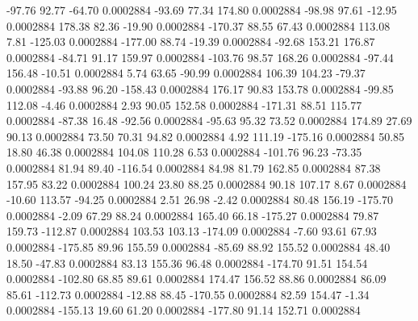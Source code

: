       -97.76       92.77      -64.70     0.0002884
      -93.69       77.34      174.80     0.0002884
      -98.98       97.61      -12.95     0.0002884
      178.38       82.36      -19.90     0.0002884
     -170.37       88.55       67.43     0.0002884
      113.08        7.81     -125.03     0.0002884
     -177.00       88.74      -19.39     0.0002884
      -92.68      153.21      176.87     0.0002884
      -84.71       91.17      159.97     0.0002884
     -103.76       98.57      168.26     0.0002884
      -97.44      156.48      -10.51     0.0002884
        5.74       63.65      -90.99     0.0002884
      106.39      104.23      -79.37     0.0002884
      -93.88       96.20     -158.43     0.0002884
      176.17       90.83      153.78     0.0002884
      -99.85      112.08       -4.46     0.0002884
        2.93       90.05      152.58     0.0002884
     -171.31       88.51      115.77     0.0002884
      -87.38       16.48      -92.56     0.0002884
      -95.63       95.32       73.52     0.0002884
      174.89       27.69       90.13     0.0002884
       73.50       70.31       94.82     0.0002884
        4.92      111.19     -175.16     0.0002884
       50.85       18.80       46.38     0.0002884
      104.08      110.28        6.53     0.0002884
     -101.76       96.23      -73.35     0.0002884
       81.94       89.40     -116.54     0.0002884
       84.98       81.79      162.85     0.0002884
       87.38      157.95       83.22     0.0002884
      100.24       23.80       88.25     0.0002884
       90.18      107.17        8.67     0.0002884
      -10.60      113.57      -94.25     0.0002884
        2.51       26.98       -2.42     0.0002884
       80.48      156.19     -175.70     0.0002884
       -2.09       67.29       88.24     0.0002884
      165.40       66.18     -175.27     0.0002884
       79.87      159.73     -112.87     0.0002884
      103.53      103.13     -174.09     0.0002884
       -7.60       93.61       67.93     0.0002884
     -175.85       89.96      155.59     0.0002884
      -85.69       88.92      155.52     0.0002884
       48.40       18.50      -47.83     0.0002884
       83.13      155.36       96.48     0.0002884
     -174.70       91.51      154.54     0.0002884
     -102.80       68.85       89.61     0.0002884
      174.47      156.52       88.86     0.0002884
       86.09       85.61     -112.73     0.0002884
      -12.88       88.45     -170.55     0.0002884
       82.59      154.47       -1.34     0.0002884
     -155.13       19.60       61.20     0.0002884
     -177.80       91.14      152.71     0.0002884
